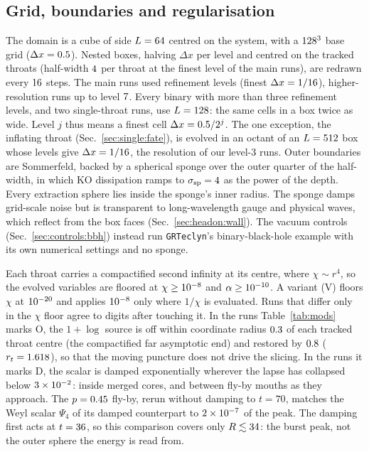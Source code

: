 \documentclass[twocolumn,floatfix,aps,prd,superscriptaddress,nofootinbib,showkeys]{revtex4-2}
\begin{document}
\subsection{Grid, boundaries and regularisation}
\label{sec:setup:grid}

The domain is a cube of side $L=64$ centred on the system, with a $128^3$ base grid ($\Delta x=0.5$). Nested boxes, halving $\Delta x$ per level and centred on the tracked throats (half-width $4$ per throat at the finest level of the main runs), are redrawn every $16$ steps. The main runs used \clmProdLevels{} refinement levels (finest $\Delta x=1/16$), higher-resolution runs up to level $7$. Every binary with more than three refinement levels, and two single-throat runs, use $L=128$: the same cells in a box twice as wide. Level $j$ thus means a finest cell $\Delta x=0.5/2^j$. The one exception, the inflating throat (Sec.~\ref{sec:single:fate}), is evolved in an octant of an $L=512$ box whose \clmFourLevel{} levels give $\Delta x=1/16$, the resolution of our level-3 runs. Outer boundaries are Sommerfeld, backed by a spherical sponge over the outer quarter of the half-width, in which KO dissipation ramps to $\sigma_{\rm sp}=4$ as the \clmSpongePower{} power of the depth. Every extraction sphere lies inside the sponge's inner radius. The sponge damps grid-scale noise but is transparent to long-wavelength gauge and physical waves, which reflect from the box faces (Sec.~\ref{sec:headon:wall}). The vacuum controls (Sec.~\ref{sec:controls:bbh}) instead run \texttt{GRTeclyn}'s binary-black-hole example with its own numerical settings and no sponge.

Each throat carries a compactified second infinity at its centre, where $\chi\sim r^4$, so the evolved variables are floored at $\chi\ge10^{-8}$ and $\alpha\ge10^{-10}$. A variant (V) floors $\chi$ at $10^{-20}$ and applies $10^{-8}$ only where $1/\chi$ is evaluated. Runs that differ only in the $\chi$ floor agree to \clmControlChiDigits{} digits after touching it. In the runs Table~\ref{tab:mods} marks O, the $1{+}\log$ source is off within coordinate radius $0.3$ of each tracked throat centre (the compactified far asymptotic end) and restored by $0.8$ ($r_t=1.618$), so that the moving puncture does not drive the slicing. In the runs it marks D, the scalar is damped exponentially wherever the lapse has collapsed below $3\times10^{-2}$: inside merged cores, and between fly-by mouths as they approach. The $p=0.45$ fly-by, rerun without damping to $t=70$, matches the Weyl scalar $\Psi_4$ of its damped counterpart to $2\times10^{-7}$ of the peak. The damping first acts at $t=36$, so this comparison covers only $R\lesssim34$: the burst peak, not the outer sphere the energy is read from.
\end{document}
